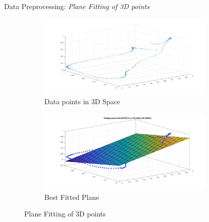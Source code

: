 \documentclass[10pt]{beamer}
\begin{document}
\begin{frame}{Data Preprocessing: \textit{Plane Fitting of 3D points} }
\begin{figure}
    \centering
    \begin{subfigure}[b]{0.4\textwidth}
        \includegraphics[width=\textwidth,height = 4cm]{scatter}
        \caption{Data points in 3D Space}
    \end{subfigure}
    \begin{subfigure}[b]{0.4\textwidth}
        \includegraphics[width=\textwidth,height = 4cm]{plane_fit}
        \caption{Best Fitted Plane}
    \end{subfigure}
    \caption{Plane Fitting of 3D points}\label{fig:3dpts}
\end{figure}
\end{frame}
\end{document}

